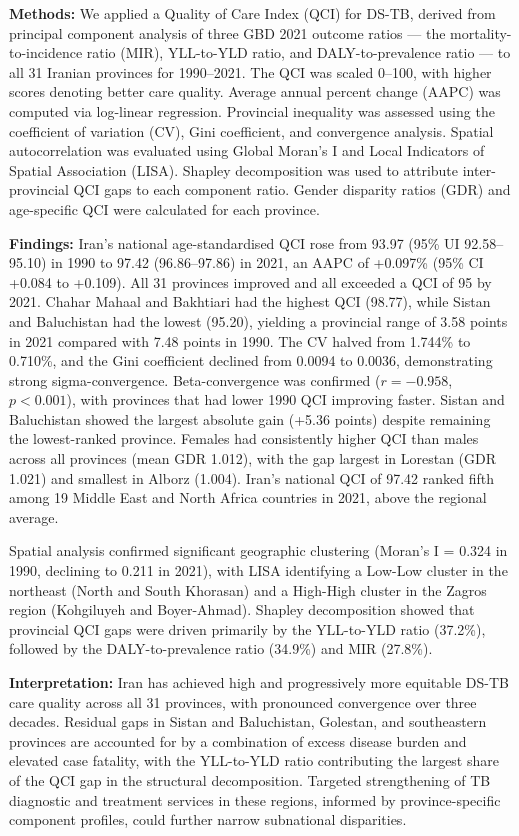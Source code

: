 \documentclass[12pt]{article}
\begin{document}
\textbf{Methods:} We applied a Quality of Care Index (QCI) for DS-TB, derived from principal component analysis of three GBD 2021 outcome ratios --- the mortality-to-incidence ratio (MIR), YLL-to-YLD ratio, and DALY-to-prevalence ratio --- to all 31 Iranian provinces for 1990--2021. The QCI was scaled 0--100, with higher scores denoting better care quality. Average annual percent change (AAPC) was computed via log-linear regression. Provincial inequality was assessed using the coefficient of variation (CV), Gini coefficient, and convergence analysis. Spatial autocorrelation was evaluated using Global Moran's I and Local Indicators of Spatial Association (LISA). Shapley decomposition was used to attribute inter-provincial QCI gaps to each component ratio. Gender disparity ratios (GDR) and age-specific QCI were calculated for each province.

\textbf{Findings:} Iran's national age-standardised QCI rose from 93.97 (95\% UI 92.58--95.10) in 1990 to 97.42 (96.86--97.86) in 2021, an AAPC of +0.097\% (95\% CI +0.084 to +0.109). All 31 provinces improved and all exceeded a QCI of 95 by 2021. Chahar Mahaal and Bakhtiari had the highest QCI (98.77), while Sistan and Baluchistan had the lowest (95.20), yielding a provincial range of 3.58 points in 2021 compared with 7.48 points in 1990. The CV halved from 1.744\% to 0.710\%, and the Gini coefficient declined from 0.0094 to 0.0036, demonstrating strong sigma-convergence. Beta-convergence was confirmed ($r = -0.958$, $p < 0.001$), with provinces that had lower 1990 QCI improving faster. Sistan and Baluchistan showed the largest absolute gain (+5.36 points) despite remaining the lowest-ranked province. Females had consistently higher QCI than males across all provinces (mean GDR 1.012), with the gap largest in Lorestan (GDR 1.021) and smallest in Alborz (1.004). Iran's national QCI of 97.42 ranked fifth among 19 Middle East and North Africa countries in 2021, above the regional average.

Spatial analysis confirmed significant geographic clustering (Moran's I = 0.324 in 1990, declining to 0.211 in 2021), with LISA identifying a Low-Low cluster in the northeast (North and South Khorasan) and a High-High cluster in the Zagros region (Kohgiluyeh and Boyer-Ahmad). Shapley decomposition showed that provincial QCI gaps were driven primarily by the YLL-to-YLD ratio (37.2\%), followed by the DALY-to-prevalence ratio (34.9\%) and MIR (27.8\%).

\textbf{Interpretation:} Iran has achieved high and progressively more equitable DS-TB care quality across all 31 provinces, with pronounced convergence over three decades. Residual gaps in Sistan and Baluchistan, Golestan, and southeastern provinces are accounted for by a combination of excess disease burden and elevated case fatality, with the YLL-to-YLD ratio contributing the largest share of the QCI gap in the structural decomposition. Targeted strengthening of TB diagnostic and treatment services in these regions, informed by province-specific component profiles, could further narrow subnational disparities.
\end{document}
